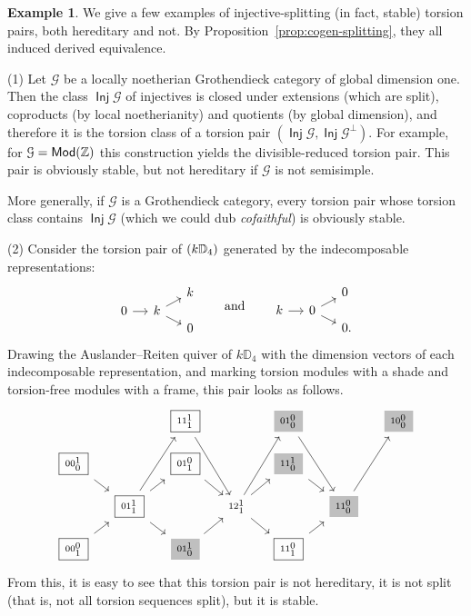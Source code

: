 \documentclass[a4paper,11pt]{amsart}
\theoremstyle{plain}
\theoremstyle{definition}
\newtheorem{ex}[thm]{Example}
\newcommand{\Gcal}{\mathcal{G}} \newcommand{\Hcal}{\mathcal{H}} \newcommand{\Ical}{\mathcal{I}}
\newcommand{\Dbb}{\mathbb{D}} \newcommand{\Ebb}{\mathbb{E}} \newcommand{\Fbb}{\mathbb{F}}
\DeclareMathOperator{\Inj}{\mathsf{Inj}}
\DeclareMathOperator{\Mod}{\mathsf{Mod}}
\let\mod\relax
\DeclareMathOperator{\mod}{\mathsf{mod}}
\newcommand{\dfour}[4]{\begin{smallmatrix}#1#2\!\begin{smallmatrix}#3\\#4\end{smallmatrix}\end{smallmatrix}}
\begin{document}
\begin{ex}\label{ex:stable}
	We give a few examples of injective-splitting (in fact, stable) torsion pairs,
	both hereditary and not. By Proposition~\ref{prop:cogen-splitting}, they all
	induced derived equivalence.

	(1) Let $\Gcal$ be a locally noetherian Grothendieck category of global
	dimension one. Then the class $\Inj\Gcal$ of injectives is closed under
	extensions (which are split), coproducts (by local noetherianity) and
	quotients
	(by global dimension), and therefore it is the torsion class of a torsion pair
	$(\Inj\Gcal,\Inj\Gcal^\bot)$. For example, for $\Gcal=\Mod(\Zbb)$ this
	construction yields the divisible-reduced torsion pair. This pair is obviously
	stable, but not hereditary if $\Gcal$ is not semisimple.

	More generally, if $\Gcal$ is a Grothendieck category, every torsion pair
	whose torsion class contains $\Inj\Gcal$ (which we could dub
	\emph{cofaithful}) is obviously stable.

	(2) Consider the torsion pair of $\mod(k\Dbb_4)$ generated by the
	indecomposable representations:
	\[\begin{tikzcd}[column sep=small, row sep=0] && k \\ 0 \ar{r} & k
	\ar{ur}\ar{dr} \\ && 0\end{tikzcd}\qquad\text{and}\qquad
	\begin{tikzcd}[column sep=small, row sep=0] && 0\phantom{.} \\ k \ar{r} & 0
	\ar{ur}\ar{dr} \\ && 0.\end{tikzcd}
	\]
	Drawing the Auslander--Reiten quiver of $k\Dbb_4$ with the dimension vectors
	of each indecomposable representation, and marking torsion modules with a
	shade and torsion-free modules with a frame, this pair looks as
	follows.
	\newcommand{\tframe}[1]{\colorbox{lightgray}{$#1$}}
	\newcommand{\fframe}[1]{\fbox{$#1$}}
	\[\begin{tikzcd}[sep=small]
		& & \fframe{\dfour1111} \ar{ddr} && \tframe{\dfour0100} \ar{ddr} &&
			\tframe{\dfour1000} \\
		\fframe{\dfour0010} \ar{dr} && \fframe{\dfour0101} \ar{dr} &&
			\tframe{\dfour1110} \ar{dr} \\
		& \fframe{\dfour0111} \ar{ur}\ar{dr}\ar{uur} && \dfour1211 \ar{ur}\ar{uur} \ar{dr} &&
			\tframe{\dfour1100} \ar{uur} \\
		\fframe{\dfour0001} \ar{ur} && \tframe{\dfour0110} \ar{ur} &&
			\fframe{\dfour1101} \ar{ur}
	\end{tikzcd}\]
	From this, it is easy to see that this torsion pair is not hereditary, it is
	not split (that is, not all torsion sequences split), but it is stable.


\end{ex}
\end{document}
